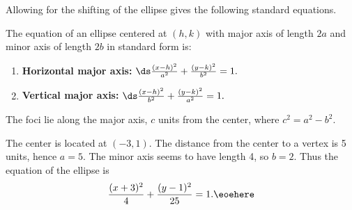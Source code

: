 Allowing for the shifting of the ellipse gives the following standard equations.
	
\begin{keyidea}\label{idea:ellipse}
The equation of an ellipse centered at $(h,k)$ with major axis of length $2a$ and minor axis of length $2b$ in standard form is:
\begin{enumerate}
	\item	\textbf{Horizontal major axis:} $\ds \frac{(x-h)^2}{a^2}+\frac{(y-k)^2}{b^2}=1.$
	\item	\textbf{Vertical major axis:} $\ds \frac{(x-h)^2}{b^2}+\frac{(y-k)^2}{a^2}=1.$
\end{enumerate}
The foci lie along the major axis, $c$ units from the center, where $c^2=a^2-b^2$.
\end{keyidea}

{The center is located at $(-3,1)$. The distance from the center to a vertex is 5 units, hence $a=5$. The minor axis seems to have length 4, so $b=2$. Thus the equation of the ellipse is
\[\frac{(x+3)^2}{4}+\frac{(y-1)^2}{25} = 1.\eoehere\]}

